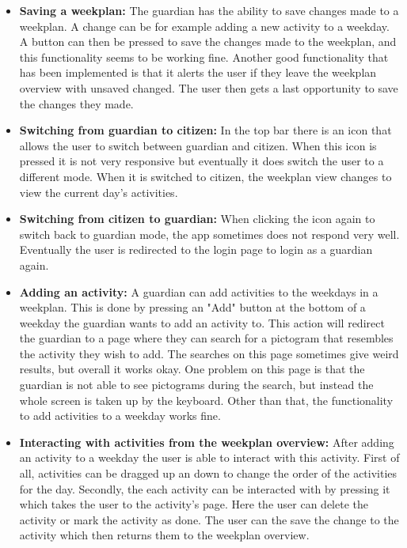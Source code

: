 \begin{itemize}
    \\
    \item \textbf{Saving a weekplan:} The guardian has the ability to save changes made to a weekplan. A change can be for example adding a new activity to a weekday.
    A button can then be pressed to save the changes made to the weekplan, and this functionality seems to be working fine.
    Another good functionality that has been implemented is that it alerts the user if they leave the weekplan overview with unsaved changed. The user then gets a last opportunity to save the changes they made.
    \\
    \item \textbf{Switching from guardian to citizen:} In the top bar there is an icon that allows the user to switch between guardian and citizen. 
    When this icon is pressed it is not very responsive but eventually it does switch the user to a different mode. 
    When it is switched to citizen, the weekplan view changes to view the current day's activities.
    \\
    \item \textbf{Switching from citizen to guardian:} When clicking the icon again to switch back to guardian mode, the app sometimes does not respond very well. 
    Eventually the user is redirected to the login page to login as a guardian again.
    \\
    \item \textbf{Adding an activity:} A guardian can add activities to the weekdays in a weekplan. This is done by pressing an "Add" button at the bottom of a weekday the guardian wants to add an activity to.
    This action will redirect the guardian to a page where they can search for a pictogram that resembles the activity they wish to add. The searches on this page sometimes give weird results, but overall it works okay.
    One problem on this page is that the guardian is not able to see pictograms during the search, but instead the whole screen is taken up by the keyboard. 
    Other than that, the functionality to add activities to a weekday works fine.
    \\
    \item \textbf{Interacting with activities from the weekplan overview:} After adding an activity to a weekday the user is able to interact with this activity. 
    First of all, activities can be dragged up an down to change the order of the activities for the day. 
    Secondly, the each activity can be interacted with by pressing it which takes the user to the activity's page. 
    Here the user can delete the activity or mark the activity as done. The user can the save the change to the activity which then returns them to the weekplan overview.
    \\
\end{itemize}
